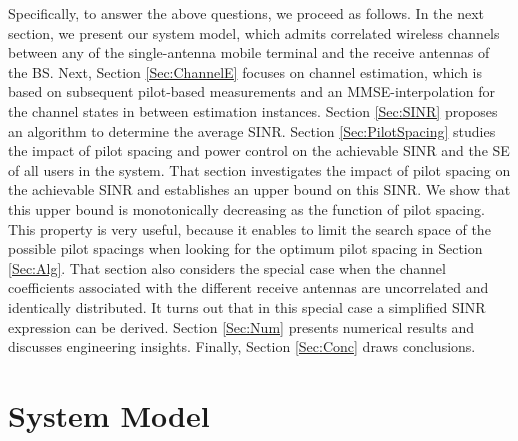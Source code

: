 \documentclass[conference, a4paper, 10pt]{IEEEtran}
\begin{document}
Specifically, to answer the above questions, we proceed as follows. In the next section, we present our system model,
which admits correlated wireless channels between any of the single-antenna mobile terminal and the receive
antennas of the \ac{BS}.
Next, Section \ref{Sec:ChannelE} focuses on channel estimation, which is based on subsequent pilot-based
measurements and an \ac{MMSE}-interpolation for the channel states in between estimation instances.
Section \ref{Sec:SINR} proposes an algorithm to determine the average \ac{SINR}.
Section \ref{Sec:PilotSpacing}  studies the impact of pilot spacing and power control on the achievable \ac{SINR} and the \ac{SE} of all users in the system.
That section investigates the impact of pilot spacing %
on the achievable \ac{SINR}
and establishes an upper bound on this \ac{SINR}. We show that this upper bound is monotonically
decreasing as the function of pilot spacing. This property is very useful, because it enables to
limit the search space of the possible pilot spacings when looking for the optimum pilot spacing in Section \ref{Sec:Alg}.
That section also considers the special case when the channel coefficients associated with the different
receive antennas are uncorrelated and identically distributed. It turns out that in this special
case a simplified \ac{SINR} expression can be derived.
Section \ref{Sec:Num} presents numerical results and discusses engineering insights.
Finally, Section \ref{Sec:Conc} draws conclusions.

\section{System Model}
\end{document}
